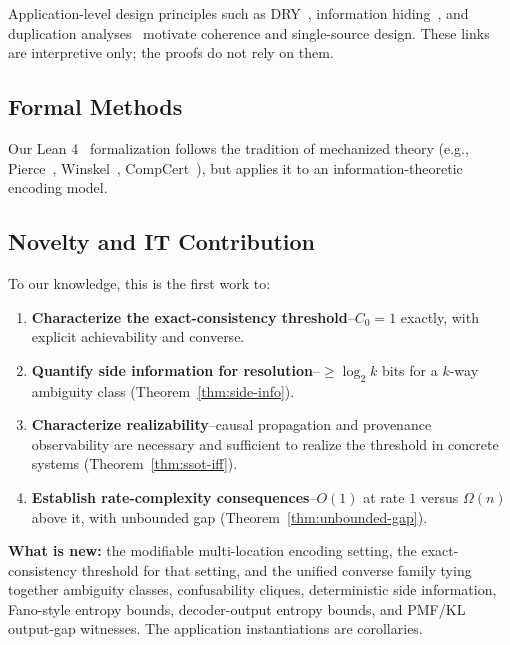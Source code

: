 Application-level design principles such as DRY~\cite{hunt1999pragmatic}, information hiding~\cite{parnas1972criteria}, and duplication analyses~\cite{fowler1999refactoring,roy2007survey} motivate coherence and single-source design. These links are interpretive only; the proofs do not rely on them.

\subsection{Formal Methods}\label{sec:related-formal}

Our Lean 4~\cite{demoura2021lean4} formalization follows the tradition of mechanized theory (e.g., Pierce~\cite{pierce2002types}, Winskel~\cite{winskel1993semantics}, CompCert~\cite{leroy2009compcert}), but applies it to an information-theoretic encoding model.

\subsection{Novelty and IT Contribution}\label{sec:novelty}

To our knowledge, this is the first work to:
\begin{enumerate}
\tightlist
\item \textbf{Characterize the exact-consistency threshold}--$C_0 = 1$ exactly, with explicit achievability and converse.

\item \textbf{Quantify side information for resolution}--$\geq \log_2 k$ bits for a $k$-way ambiguity class (Theorem~\ref{thm:side-info}).

\item \textbf{Characterize realizability}--causal propagation and provenance observability are necessary and sufficient to realize the threshold in concrete systems (Theorem~\ref{thm:ssot-iff}).

\item \textbf{Establish rate-complexity consequences}--$O(1)$ at rate $1$ versus $\Omega(n)$ above it, with unbounded gap (Theorem~\ref{thm:unbounded-gap}).
\end{enumerate}

\textbf{What is new:} the modifiable multi-location encoding setting, the exact-consistency threshold for that setting, and the unified converse family tying together ambiguity classes, confusability cliques, deterministic side information, Fano-style entropy bounds, decoder-output entropy bounds, and PMF/KL output-gap witnesses. The application instantiations are corollaries.


